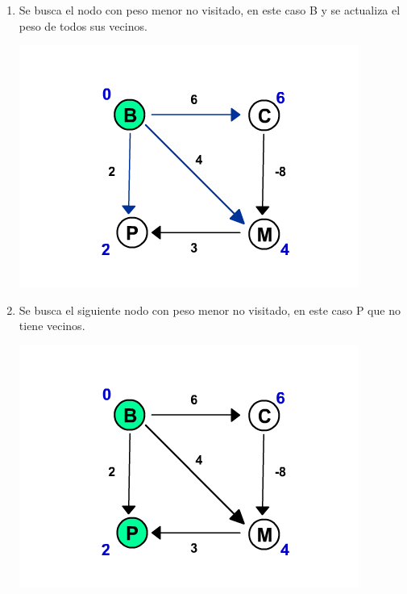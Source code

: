 \documentclass[dcc,sol]{fcfmcourse}
\begin{document}
\begin{problems}
\begin{enumerate}[1.]
\newpage
\item Se busca el nodo con peso menor no visitado, en este caso B y se actualiza el peso de todos sus vecinos.
\begin{center}
\includegraphics[scale=0.65]{dijkstra0009.png}
\end{center}

\item Se busca el siguiente nodo con peso menor no visitado, en este caso P que no tiene vecinos.
\begin{center}
\includegraphics[scale=0.65]{dijkstra0010.png}
\end{center}


\end{enumerate}
\end{problems}
\end{document}
